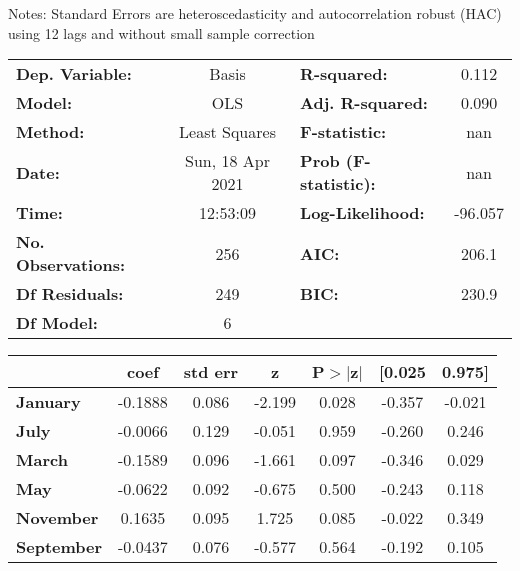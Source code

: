 Notes: \newline
 [1] Standard Errors are heteroscedasticity and autocorrelation robust (HAC) using 12 lags and without small sample correction
\begin{center}
\begin{tabular}{lclc}
\toprule
\textbf{Dep. Variable:}    &      Basis       & \textbf{  R-squared:         } &     0.112   \\
\textbf{Model:}            &       OLS        & \textbf{  Adj. R-squared:    } &     0.090   \\
\textbf{Method:}           &  Least Squares   & \textbf{  F-statistic:       } &       nan   \\
\textbf{Date:}             & Sun, 18 Apr 2021 & \textbf{  Prob (F-statistic):} &      nan    \\
\textbf{Time:}             &     12:53:09     & \textbf{  Log-Likelihood:    } &   -96.057   \\
\textbf{No. Observations:} &         256      & \textbf{  AIC:               } &     206.1   \\
\textbf{Df Residuals:}     &         249      & \textbf{  BIC:               } &     230.9   \\
\textbf{Df Model:}         &           6      & \textbf{                     } &             \\
\bottomrule
\end{tabular}
\begin{tabular}{lcccccc}
                   & \textbf{coef} & \textbf{std err} & \textbf{z} & \textbf{P$> |$z$|$} & \textbf{[0.025} & \textbf{0.975]}  \\
\midrule
\textbf{January}   &      -0.1888  &        0.086     &    -2.199  &         0.028        &       -0.357    &       -0.021     \\
\textbf{July}      &      -0.0066  &        0.129     &    -0.051  &         0.959        &       -0.260    &        0.246     \\
\textbf{March}     &      -0.1589  &        0.096     &    -1.661  &         0.097        &       -0.346    &        0.029     \\
\textbf{May}       &      -0.0622  &        0.092     &    -0.675  &         0.500        &       -0.243    &        0.118     \\
\textbf{November}  &       0.1635  &        0.095     &     1.725  &         0.085        &       -0.022    &        0.349     \\
\textbf{September} &      -0.0437  &        0.076     &    -0.577  &         0.564        &       -0.192    &        0.105     \\

\end{tabular}
\end{center}

